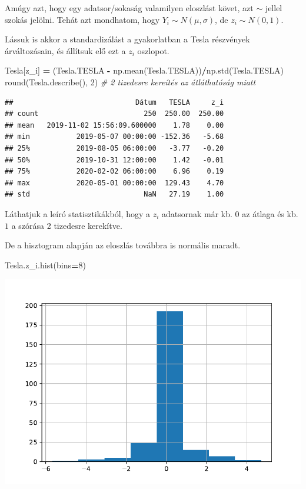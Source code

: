 \documentclass[
]{book}
\newenvironment{Shaded}{\begin{snugshade}}{\end{snugshade}}
\newcommand{\BuiltInTok}[1]{#1}
\newcommand{\CommentTok}[1]{\textcolor[rgb]{0.56,0.35,0.01}{\textit{#1}}}
\newcommand{\DecValTok}[1]{\textcolor[rgb]{0.00,0.00,0.81}{#1}}
\newcommand{\NormalTok}[1]{#1}
\newcommand{\OperatorTok}[1]{\textcolor[rgb]{0.81,0.36,0.00}{\textbf{#1}}}
\newcommand{\StringTok}[1]{\textcolor[rgb]{0.31,0.60,0.02}{#1}}
\begin{document}
Amúgy azt, hogy egy adatsor/sokaság valamilyen eloszlást követ, azt \(\sim\) jellel szokás jelölni. Tehát azt mondhatom, hogy \(Y_i \sim N(\mu,\sigma)\), de \(z_i \sim N(0,1)\).

Lássuk is akkor a standardizálást a gyakorlatban a Tesla részvények árváltozásain, és állítsuk elő ezt a \(z_i\) oszlopot.

\begin{Shaded}
\begin{Highlighting}[]
\NormalTok{Tesla[}\StringTok{\textquotesingle{}z\_i\textquotesingle{}}\NormalTok{] }\OperatorTok{=}\NormalTok{ (Tesla.TESLA }\OperatorTok{{-}}\NormalTok{ np.mean(Tesla.TESLA))}\OperatorTok{/}\NormalTok{np.std(Tesla.TESLA)}
\BuiltInTok{round}\NormalTok{(Tesla.describe(), }\DecValTok{2}\NormalTok{) }\CommentTok{\# 2 tizedesre kereítés az átláthatóság miatt}
\end{Highlighting}
\end{Shaded}

\begin{verbatim}
##                             Dátum   TESLA     z_i
## count                         250  250.00  250.00
## mean   2019-11-02 15:56:09.600000    1.78    0.00
## min           2019-05-07 00:00:00 -152.36   -5.68
## 25%           2019-08-05 06:00:00   -3.77   -0.20
## 50%           2019-10-31 12:00:00    1.42   -0.01
## 75%           2020-02-02 06:00:00    6.96    0.19
## max           2020-05-01 00:00:00  129.43    4.70
## std                           NaN   27.19    1.00
\end{verbatim}

Láthatjuk a leíró statisztikákból, hogy a \(z_i\) adatsornak már kb. \(0\) az átlaga és kb. \(1\) a szórása 2 tizedesre kerekítve.

De a hisztogram alapján az eloszlás továbbra is normális maradt.

\begin{Shaded}
\begin{Highlighting}[]
\NormalTok{Tesla.z\_i.hist(bins}\OperatorTok{=}\DecValTok{8}\NormalTok{)}
\end{Highlighting}
\end{Shaded}

\includegraphics{_main_files/figure-latex/unnamed-chunk-176-3.pdf}
\end{document}
